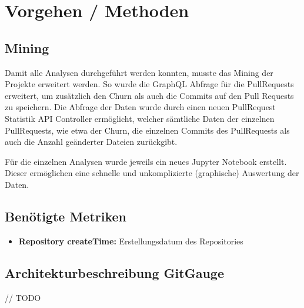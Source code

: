 


\chapter{Vorgehen / Methoden} %

\label{Chapter3} %


\section{Mining}
Damit alle Analysen durchgeführt werden konnten, musste das Mining der Projekte erweitert werden. So wurde die GraphQL Abfrage für die PullRequests erweitert, um zusätzlich den Churn als auch die Commits auf den Pull Requests zu speichern. Die Abfrage der Daten wurde durch einen neuen PullRequest Statistik API Controller ermöglicht, welcher sämtliche Daten der einzelnen PullRequests, wie etwa der Churn, die einzelnen Commits des PullRequests als auch die Anzahl geänderter Dateien zurückgibt. 

Für die einzelnen Analysen wurde jeweils ein neues Jupyter Notebook erstellt. Dieser ermöglichen eine schnelle und unkomplizierte (graphische) Auswertung der Daten. \parencite{stumpf_simon_repo-detectivesba-metric-analysis-scripts_nodate}

\section{Benötigte Metriken}
\label{sec:Metriken}
\begin{itemize}
    \item \textbf{Repository createTime:} Erstellungsdatum des Repositories
\end{itemize}

\section{Architekturbeschreibung GitGauge}
// TODO 

